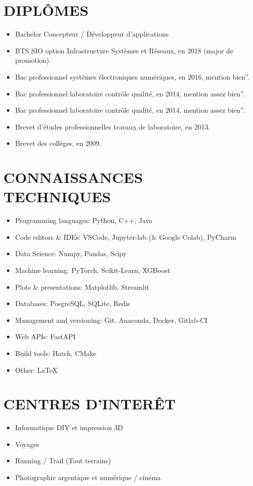 \documentclass[a4paper,twoside]{article}
\begin{document}
\begin{multicols}{2}
    \section*{DIPLÔMES}
    \begin{itemize}
        \item Bachelor Concepteur / Développeur d’applications
        \item BTS SIO option Infrastructure Systèmes et Réseaux, en 2018 (major de promotion).
        \item Bac professionnel systèmes électroniques numériques, en 2016, mention bien''. \item Bac professionnel laboratoire contrôle qualité, en 2014, mention assez bien''.
        \item Bac professionnel laboratoire contrôle qualité, en 2014, mention assez bien''.
        \item Brevet d'études professionnelles travaux de laboratoire, en 2013.
        \item Brevet des collèges, en 2009.
    \end{itemize}

    \section*{CONNAISSANCES
      \newline TECHNIQUES}

    \begin{itemize}
        \item Programming languages: Python, C++, Java
        \item Code editors \& IDEs: VSCode, Jupyter-lab (\& Google Colab), PyCharm
        \item Data Science: Numpy, Pandas, Scipy
        \item Machine learning: PyTorch, Scikit-Learn, XGBoost
        \item Plots \& presentations: Matplotlib, Streamlit
        \item Databases: PosgreSQL, SQLite, Redis
        \item Management and versioning: Git, Anaconda, Docker, Gitlab-CI
        \item Web APIs: FastAPI
        \item Build tools: Hatch, CMake
        \item Other: LaTeX
    \end{itemize}

    \section*{CENTRES D'INTERÊT}

    \begin{itemize}
        \item Informatique DIY et impression 3D
        \item Voyages
        \item Running / Trail (Tout terrains)
        \item Photographie argentique et numérique / cinéma
    \end{itemize}

\end{multicols}
\end{document}
